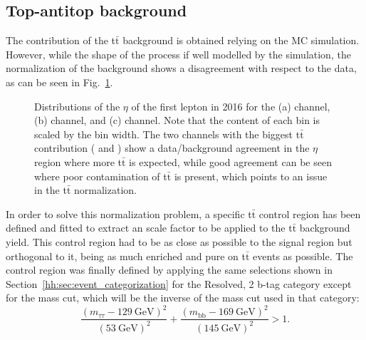 \documentclass[../main.tex]{subfiles}
\begin{document}
\subsection{Top-antitop background}
\label{hh:subsec:tt}

The contribution of the t$\bar{\text{t}}$ background is obtained relying on the MC simulation. However, while the shape of the process if well modelled by the simulation, the normalization of the background shows a disagreement with respect to the data, as can be seen in Fig.~\ref{hh:fig:ttbar_disc}.

\begin{figure}[h]
\begin{center}
\end{center}
\caption{Distributions of the $\eta$ of the first lepton in 2016 for the (a) \taumu\tauh{} channel, (b) \taue\tauh{} channel, and (c) \tauh\tauh{} channel. Note that the content of each bin is scaled by the bin width. The two channels with the biggest t$\bar{\text{t}}$ contribution (\taumu\tauh{} and \taue\tauh{}) show a data/background agreement in the $\eta$ region where more t$\bar{\text{t}}$ is expected, while good agreement can be seen where poor contamination of t$\bar{\text{t}}$ is present, which points to an issue in the t$\bar{\text{t}}$ normalization.}
\label{hh:fig:ttbar_disc}
\end{figure}

In order to solve this normalization problem, a specific t$\bar{\text{t}}$ control region has been defined and fitted to extract an scale factor to be applied to the t$\bar{\text{t}}$ background yield. This control region had to be as close as possible to the signal region but orthogonal to it, being as much enriched and pure on t$\bar{\text{t}}$ events as possible. The control region was finally defined by applying the same selections shown in Section~\ref{hh:sec:event_categorization} for the Resolved, 2 b-tag category except for the mass cut, which will be the inverse of the mass cut used in that category:
\begin{equation}
\frac{(m_{\tau\tau} - 129~\text{GeV})^2}{(53~\text{GeV})^2} + \frac{(m_\text{bb} - 169~\text{GeV})^2}{(145~\text{GeV})^2} > 1.
\end{equation}
\end{document}
